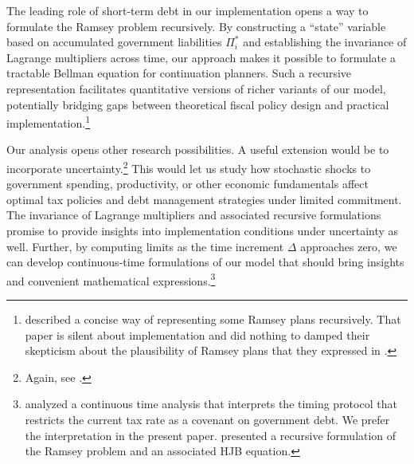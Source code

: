 \documentclass[12pt]{article}
\newcommand{\WJ}[1]{{\textcolor{red}{#1}}}
\begin{document}

The leading role of  short-term debt in our implementation opens a way to formulate the Ramsey problem  recursively. {By constructing a ``state'' variable based on accumulated  government liabilities $\Pi_i^\ast$  and establishing the invariance of Lagrange multipliers across time, our approach makes it possible to formulate a tractable Bellman equation for continuation planners. Such a recursive representation   facilitates quantitative versions of richer  variants of our model, potentially bridging  gaps between theoretical fiscal policy design and practical implementation.\footnote{\citet{kydland1980dynamic}   described a concise  way of representing  some Ramsey plans  recursively.
That paper is silent about implementation and did nothing to damped their skepticism about the plausibility of Ramsey plans that they expressed in \citet{kydland1977rules}.}   }

Our analysis opens other research possibilities. A useful  extension would be   to incorporate uncertainty.\footnote{Again, see \citet[ftnt.~1]{LucasStokey1983}.}  This would let us  study how stochastic shocks to government spending, productivity, or other economic fundamentals affect optimal tax policies and debt management strategies under limited commitment. The invariance of Lagrange multipliers and associated recursive formulations promise to provide insights into implementation conditions under uncertainty as well.
Further, by computing   limits as the time increment $\Delta$ approaches zero, we can develop continuous-time formulations of our model that  should bring insights and convenient mathematical expressions.\footnote{\citet{JiangSargentWang2024} analyzed  a continuous time analysis that interprets the timing protocol that restricts the current tax rate as a covenant on government debt. We prefer the interpretation in the present  paper. \citeauthor{JiangSargentWang2024} presented  a recursive formulation of the Ramsey problem and an associated HJB equation.}
 
\end{document}
